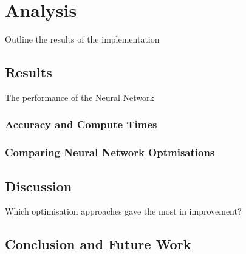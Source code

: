 \part{Analysis}

Outline the results of the implementation

\chapter{Results}
The performance of the Neural Network

\section{Accuracy and Compute Times}

\section{Comparing Neural Network Optmisations}

\chapter{Discussion}
Which optimisation approaches gave the most in improvement?

\chapter{Conclusion and Future Work}
